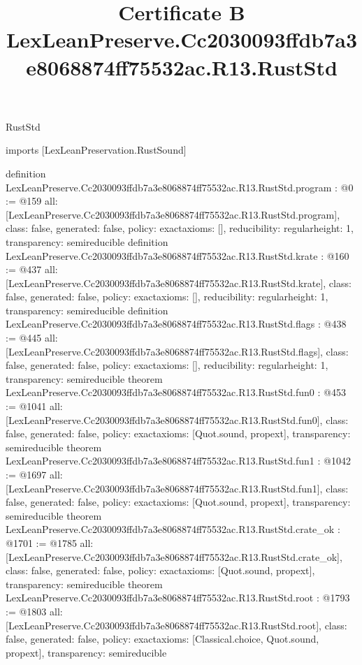 \begin{lexlean}{RustStd}
\title{Certificate B LexLeanPreserve.Cc2030093ffdb7a3e8068874ff75532ac.R13.RustStd}
\begin{coremodule}
imports [LexLeanPreservation.RustSound]

definition LexLeanPreserve.Cc2030093ffdb7a3e8068874ff75532ac.R13.RustStd.program : @0 := @159 {
  all: [LexLeanPreserve.Cc2030093ffdb7a3e8068874ff75532ac.R13.RustStd.program],
  class: false,
  generated: false,
  policy: exact{axioms: []},
  reducibility: regular{height: 1},
  transparency: semireducible
}
definition LexLeanPreserve.Cc2030093ffdb7a3e8068874ff75532ac.R13.RustStd.krate : @160 := @437 {
  all: [LexLeanPreserve.Cc2030093ffdb7a3e8068874ff75532ac.R13.RustStd.krate],
  class: false,
  generated: false,
  policy: exact{axioms: []},
  reducibility: regular{height: 1},
  transparency: semireducible
}
definition LexLeanPreserve.Cc2030093ffdb7a3e8068874ff75532ac.R13.RustStd.flags : @438 := @445 {
  all: [LexLeanPreserve.Cc2030093ffdb7a3e8068874ff75532ac.R13.RustStd.flags],
  class: false,
  generated: false,
  policy: exact{axioms: []},
  reducibility: regular{height: 1},
  transparency: semireducible
}
theorem LexLeanPreserve.Cc2030093ffdb7a3e8068874ff75532ac.R13.RustStd.fun0 : @453 := @1041 {
  all: [LexLeanPreserve.Cc2030093ffdb7a3e8068874ff75532ac.R13.RustStd.fun0],
  class: false,
  generated: false,
  policy: exact{axioms: [Quot.sound, propext]},
  transparency: semireducible
}
theorem LexLeanPreserve.Cc2030093ffdb7a3e8068874ff75532ac.R13.RustStd.fun1 : @1042 := @1697 {
  all: [LexLeanPreserve.Cc2030093ffdb7a3e8068874ff75532ac.R13.RustStd.fun1],
  class: false,
  generated: false,
  policy: exact{axioms: [Quot.sound, propext]},
  transparency: semireducible
}
theorem LexLeanPreserve.Cc2030093ffdb7a3e8068874ff75532ac.R13.RustStd.crate_ok : @1701 := @1785 {
  all: [LexLeanPreserve.Cc2030093ffdb7a3e8068874ff75532ac.R13.RustStd.crate_ok],
  class: false,
  generated: false,
  policy: exact{axioms: [Quot.sound, propext]},
  transparency: semireducible
}
theorem LexLeanPreserve.Cc2030093ffdb7a3e8068874ff75532ac.R13.RustStd.root : @1793 := @1803 {
  all: [LexLeanPreserve.Cc2030093ffdb7a3e8068874ff75532ac.R13.RustStd.root],
  class: false,
  generated: false,
  policy: exact{axioms: [Classical.choice, Quot.sound, propext]},
  transparency: semireducible
}


\end{coremodule}
\end{lexlean}
